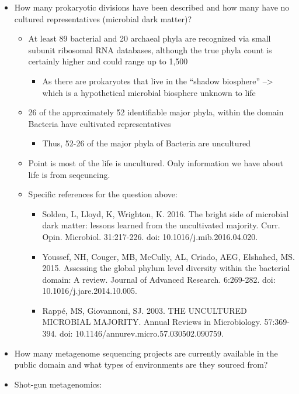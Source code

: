 \documentclass[]{article}
\providecommand{\tightlist}{%
  \setlength{\itemsep}{0pt}\setlength{\parskip}{0pt}}
\begin{document}
\begin{itemize}
\item
  How many prokaryotic divisions have been described and how many have
  no cultured representatives (microbial dark matter)?

  \begin{itemize}
  \item
    At least 89 bacterial and 20 archaeal phyla are recognized via small
    subunit ribosomal RNA databases, although the true phyla count is
    certainly higher and could range up to 1,500

    \begin{itemize}
    \tightlist
    \item
      As there are prokaryotes that live in the ``shadow biosphere''
      --\textgreater{} which is a hypothetical microbial biosphere
      unknown to life
    \end{itemize}
  \item
    26 of the approximately 52 identifiable major phyla, within the
    domain Bacteria have cultivated representatives

    \begin{itemize}
    \tightlist
    \item
      Thus, 52-26 of the major phyla of Bacteria are uncultured
    \end{itemize}
  \item
    Point is most of the life is uncultured. Only information we have
    about life is from seqeuncing.
  \item
    Specific references for the question above:

    \begin{itemize}
    \item
      Solden, L, Lloyd, K, Wrighton, K. 2016. The bright side of
      microbial dark matter: lessons learned from the uncultivated
      majority. Curr. Opin. Microbiol. 31:217-226. doi:
      10.1016/j.mib.2016.04.020.
    \item
      Youssef, NH, Couger, MB, McCully, AL, Criado, AEG, Elshahed, MS.
      2015. Assessing the global phylum level diversity within the
      bacterial domain: A review. Journal of Advanced Research.
      6:269-282. doi: 10.1016/j.jare.2014.10.005.
    \item
      Rappé, MS, Giovannoni, SJ. 2003. THE UNCULTURED MICROBIAL
      MAJORITY. Annual Reviews in Microbiology. 57:369-394. doi:
      10.1146/annurev.micro.57.030502.090759.
    \end{itemize}
  \end{itemize}
\item
  How many metagenome sequencing projects are currently available in the
  public domain and what types of environments are they sourced from?
\item
  Shot-gun metagenomics:


\end{itemize}
\end{document}
